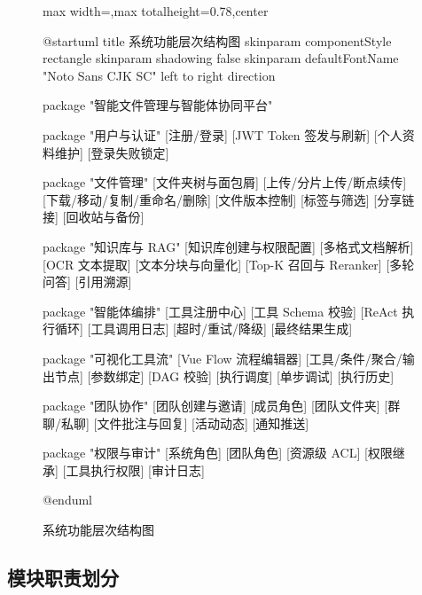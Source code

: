 \documentclass[a4paper,zihao=-4]{ctexart}
\begin{document}
\begin{figure}[H]
\centering
\begin{adjustbox}{max width=\linewidth,max totalheight=0.78\textheight,center}
\begingroup
\renewcommand{\PlantUMLJobname}{plantuml-diagrams/req-uml-02}
\begin{plantuml}
@startuml
title 系统功能层次结构图
skinparam componentStyle rectangle
skinparam shadowing false
skinparam defaultFontName "Noto Sans CJK SC"
left to right direction

package "智能文件管理与智能体协同平台" {
  package "用户与认证" {
    [注册/登录]
    [JWT Token 签发与刷新]
    [个人资料维护]
    [登录失败锁定]
  }

  package "文件管理" {
    [文件夹树与面包屑]
    [上传/分片上传/断点续传]
    [下载/移动/复制/重命名/删除]
    [文件版本控制]
    [标签与筛选]
    [分享链接]
    [回收站与备份]
  }

  package "知识库与 RAG" {
    [知识库创建与权限配置]
    [多格式文档解析]
    [OCR 文本提取]
    [文本分块与向量化]
    [Top-K 召回与 Reranker]
    [多轮问答]
    [引用溯源]
  }

  package "智能体编排" {
    [工具注册中心]
    [工具 Schema 校验]
    [ReAct 执行循环]
    [工具调用日志]
    [超时/重试/降级]
    [最终结果生成]
  }

  package "可视化工具流" {
    [Vue Flow 流程编辑器]
    [工具/条件/聚合/输出节点]
    [参数绑定]
    [DAG 校验]
    [执行调度]
    [单步调试]
    [执行历史]
  }

  package "团队协作" {
    [团队创建与邀请]
    [成员角色]
    [团队文件夹]
    [群聊/私聊]
    [文件批注与回复]
    [活动动态]
    [通知推送]
  }

  package "权限与审计" {
    [系统角色]
    [团队角色]
    [资源级 ACL]
    [权限继承]
    [工具执行权限]
    [审计日志]
  }
}
@enduml
\end{plantuml}
\endgroup
\end{adjustbox}
\caption{系统功能层次结构图}
\end{figure}

\hypertarget{ux6a21ux5757ux804cux8d23ux5212ux5206}{%
\subsection{模块职责划分}\label{ux6a21ux5757ux804cux8d23ux5212ux5206}}
\end{document}
